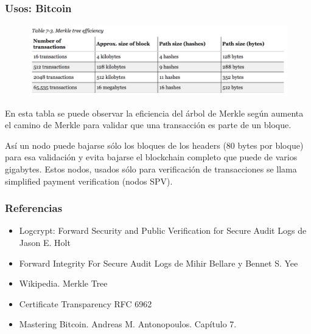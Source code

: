 \documentclass[10pt, a4paper,english,spanish]{beamer}
\begin{document}
\begin{frame}
\frametitle{Usos: Bitcoin}

\begin{figure}
\centering
  \includegraphics[width=\linewidth]{imagenes/mt_efficiency.png}
\end{figure}

En esta tabla se puede observar la eficiencia del \'arbol de Merkle seg\'un aumenta el camino de Merkle para validar que una transacci\'on es parte de un bloque.

As\'i un nodo puede bajarse s\'olo los bloques de los headers (80 bytes por bloque) para esa validaci\'on y evita bajarse el blockchain completo que puede de varios gigabytes. Estos nodos, usados s\'olo para verificaci\'on de transacciones se llama simplified payment verification (nodos SPV). 

\end{frame}




\begin{frame}
\frametitle{Referencias}


\begin{itemize}

\item Logcrypt: Forward Security and Public Verification for Secure Audit Logs de Jason E. Holt
\item Forward Integrity For Secure Audit Logs de Mihir Bellare y Bennet S. Yee

\item Wikipedia. Merkle Tree
\item Certificate Transparency RFC 6962 

\item Mastering Bitcoin. Andreas M. Antonopoulos. Cap\'itulo 7.


\end{itemize}
\end{frame}
\end{document}

